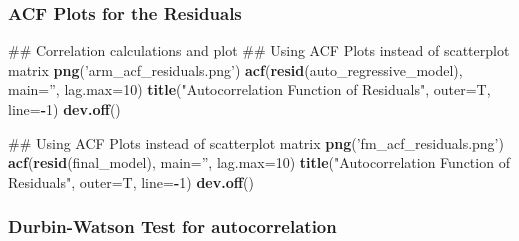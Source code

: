 \documentclass[]{article}
\newenvironment{Shaded}{\begin{snugshade}}{\end{snugshade}}
\newcommand{\KeywordTok}[1]{\textcolor[rgb]{0.13,0.29,0.53}{\textbf{#1}}}
\newcommand{\DataTypeTok}[1]{\textcolor[rgb]{0.13,0.29,0.53}{#1}}
\newcommand{\DecValTok}[1]{\textcolor[rgb]{0.00,0.00,0.81}{#1}}
\newcommand{\StringTok}[1]{\textcolor[rgb]{0.31,0.60,0.02}{#1}}
\newcommand{\OperatorTok}[1]{\textcolor[rgb]{0.81,0.36,0.00}{\textbf{#1}}}
\newcommand{\NormalTok}[1]{#1}
\begin{document}
\subsubsection{ACF Plots for the
Residuals}\label{acf-plots-for-the-residuals}

\begin{Shaded}
\begin{Highlighting}[]
\NormalTok{## Correlation calculations and plot}
\NormalTok{## Using ACF Plots instead of scatterplot matrix}
\KeywordTok{png}\NormalTok{(}\StringTok{'arm_acf_residuals.png'}\NormalTok{)}
\KeywordTok{acf}\NormalTok{(}\KeywordTok{resid}\NormalTok{(auto_regressive_model), }\DataTypeTok{main=}\StringTok{''}\NormalTok{, }\DataTypeTok{lag.max=}\DecValTok{10}\NormalTok{)}
\KeywordTok{title}\NormalTok{(}\StringTok{"Autocorrelation Function of Residuals"}\NormalTok{, }
      \DataTypeTok{outer=}\NormalTok{T, }\DataTypeTok{line=}\OperatorTok{-}\DecValTok{1}\NormalTok{)}
\KeywordTok{dev.off}\NormalTok{()}

\NormalTok{## Using ACF Plots instead of scatterplot matrix}
\KeywordTok{png}\NormalTok{(}\StringTok{'fm_acf_residuals.png'}\NormalTok{)}
\KeywordTok{acf}\NormalTok{(}\KeywordTok{resid}\NormalTok{(final_model), }\DataTypeTok{main=}\StringTok{''}\NormalTok{, }\DataTypeTok{lag.max=}\DecValTok{10}\NormalTok{)}
\KeywordTok{title}\NormalTok{(}\StringTok{"Autocorrelation Function of Residuals"}\NormalTok{, }
      \DataTypeTok{outer=}\NormalTok{T, }\DataTypeTok{line=}\OperatorTok{-}\DecValTok{1}\NormalTok{)}
\KeywordTok{dev.off}\NormalTok{()}
\end{Highlighting}
\end{Shaded}

\subsubsection{Durbin-Watson Test for
autocorrelation}\label{durbin-watson-test-for-autocorrelation}
\end{document}
